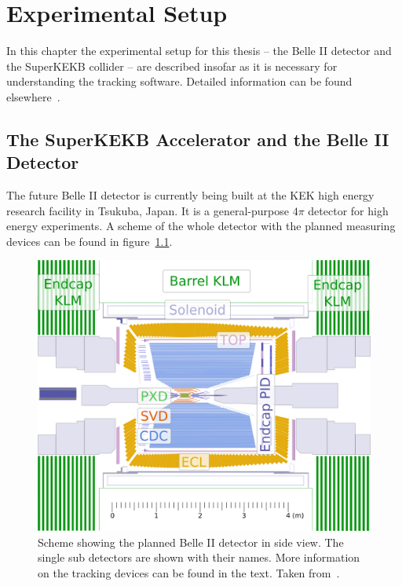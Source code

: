 \chapter{Experimental Setup} \label{chapter-ex}
In this chapter the experimental setup for this thesis -- the Belle II detector and the SuperKEKB collider -- are described insofar as it is necessary for understanding the tracking software. Detailed information can be found elsewhere~\cite{tdr}.


\section{The SuperKEKB Accelerator and the Belle II Detector}

The future Belle II detector is currently being built at the KEK high energy research facility in Tsukuba, Japan. It is a general-purpose $4\pi$ detector for high energy experiments. A scheme of the whole detector with the planned measuring devices can be found in figure~\ref{fig-belle2}.

\begin{figure}
 \centering
 \includegraphics[height=0.4\textheight]{figures/experimental_setup/detector_crossection_labels.pdf}
 \caption[Schema of the planned Belle II detector.]{Scheme showing the planned Belle II detector in side view. The single sub detectors are shown with their names. More information on the tracking devices can be found in the text. Taken from~\cite{christian}.}
 \label{fig-belle2}
\end{figure}

